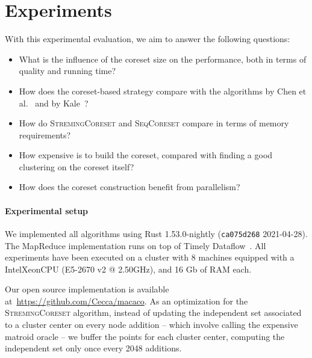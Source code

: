 \section{Experiments}

\newcommand{\mc}[1]{{\color{red} --- MC: #1 ---}}

\graphicspath{{../imgs/}}

\newcommand{\data}[1]{\texttt{#1}}
\newcommand{\higgs}{\texttt{Higgs}\xspace}
\newcommand{\phones}{\texttt{Phones}\xspace}
\newcommand{\wiki}{\texttt{Wiki}\xspace}
\newcommand{\chen}{\textsc{ChenEtAl}\xspace}
\newcommand{\seq}{\textsc{SeqCoreset}\xspace}
\newcommand{\stream}{\textsc{StremingCoreset}\xspace}
\newcommand{\mapr}{\textsc{MRCoreset}\xspace}

With this experimental evaluation, we aim to answer the following questions:
\begin{itemize}
    \item What is the influence of the coreset size on the performance, 
        both in terms of quality and running time?
    \item How does the coreset-based strategy compare with the algorithms
        by Chen et al.~\cite{DBLP:journals/algorithmica/ChenLLW16}
        and by Kale~\cite{DBLP:conf/approx/Kale19}?
    \item How do \stream and \seq compare in terms of memory requirements?
    \item How expensive is to build the coreset, compared with finding
        a good clustering on the coreset itself?
    \item How does the coreset construction benefit from parallelism?
\end{itemize}

\paragraph*{Experimental setup}
We implemented all algorithms using Rust 1.53.0-nightly (\texttt{ca075d268} 2021-04-28).
The MapReduce implementation runs on top of Timely Dataflow~\cite{DBLP:journals/cacm/MurrayMIIBA16}.
All experiments have been executed on a cluster with 8 machines equipped
with a Intel\textregistered Xeon\textregistered CPU (E5-2670 v2 @ 2.50GHz), and 16 Gb of RAM each.

Our open source implementation is available at~\url{https://github.com/Cecca/macaco}.
As an optimization for the \stream algorithm, instead of updating the independent set associated to a cluster center on every node addition
-- which involve calling the expensive matroid oracle -- we buffer the points for each cluster center,
computing the independent set only once every 2048 additions.

